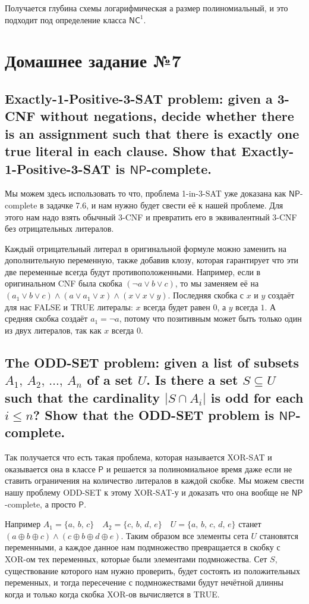 \documentclass{article}
\newcommand{\NP}{\ensuremath{\mathsf{NP}}}
\newcommand{\NC}{\ensuremath{\mathsf{NC}^1}}
\renewcommand{\P}{\ensuremath{\mathsf{P}}}
\begin{document}
  \noindent
  Получается глубина схемы логарифмическая а размер полиномиальный, и это подходит под определение класса \NC.

  \section{Домашнее задание №7}
  \setcounter{subsection}{10}
  \subsection{Exactly-1-Positive-3-SAT problem: given a 3-CNF without negations, decide whether there is an assignment such that there is exactly one true literal in each clause. Show that Exactly-1-Positive-3-SAT is \NP-complete.}
  Мы можем здесь использовать то что, проблема 1-in-3-SAT уже доказана как \NP-complete в задачке 7.6, и нам нужно будет свести её к нашей проблеме.
  Для этого нам надо взять обычный 3-CNF и превратить его в эквивалентный 3-CNF без отрицательных литералов.

  Каждый отрицательный литерал в оригинальной формуле можно заменить на дополнительную переменную, также добавив клозу, которая гарантирует что эти две переменные всегда будут противоположенными.
  Например, если в оригинальном CNF была скобка $(\lnot a \lor b \lor c)$, то мы заменяем её на $(a_1 \lor b \lor c) \land (a \lor a_1 \lor x) \land (x \lor x \lor y)$.
  Последняя скобка с $x$ и $y$ создаёт для нас FALSE и TRUE литералы: $x$ всегда будет равен $0$, а $y$ всегда $1$.
  А средняя скобка создаёт $a_1 = \lnot a$, потому что позитивным может быть только один из двух литералов, так как $x$ всегда $0$.

  \subsection{The ODD-SET problem: given a list of subsets $A_1,\, A_2,\, \dots,\, A_n$ of a set $U$. Is there a set $S \subseteq U$ such that the cardinality $|S \cap A_i|$ is odd for each $i \leq n$? Show that the ODD-SET problem is \NP-complete.}
  Так получается что есть такая проблема, которая называется XOR-SAT и оказывается она в классе \P{} и решается за полиномиальное время даже если не ставить ограничения на количество литералов в каждой скобке.
  Мы можем свести нашу проблему ODD-SET к этому XOR-SAT-у и доказать что она вообще не \NP-complete, а просто \P.

  Например $A_1 = \{a,\, b,\, c\} \quad A_2 = \{c,\, b,\, d,\, e\} \quad U = \{a,\, b,\, c,\, d,\, e\}$ станет $(a \oplus b \oplus c) \land (c \oplus b \oplus d \oplus e)$.
  Таким образом все элементы сета $U$ становятся переменными, а каждое данное нам подмножество превращается в скобку с XOR-ом тех переменных, которые были элементами подмножества.
  Сет $S$, существование которого нам нужно проверить, будет состоять из положительных переменных, и тогда пересечение с подмножествами будут нечётной длинны когда и только когда скобка XOR-ов вычисляется в TRUE.
\end{document}
